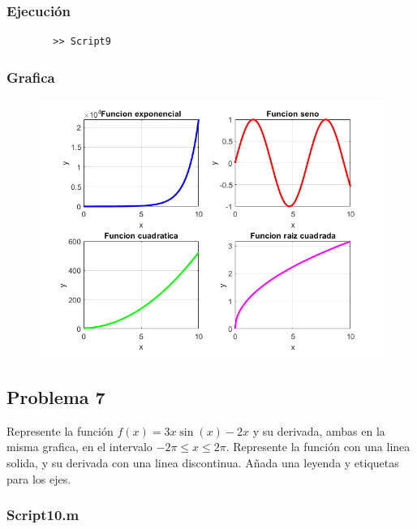 \documentclass{article}
\begin{document}
	\subsubsection{Ejecución}
	
	\begin{lstlisting}
		>> Script9
	\end{lstlisting}
	
	\newpage
	
	\subsubsection{Grafica}
	
	\begin{figure}[h]
		\centering
		\includegraphics[width=\textwidth]{grafica9.png}
	\end{figure}
	
	\newpage
	
	\subsection{Problema 7}
	
	Represente la función $f(x) = 3x \sin(x)-2x$ y su derivada, ambas en la misma grafica, en el intervalo $-2\pi \leq x \leq 2\pi$. Represente la función con una linea solida, y su derivada con una linea discontinua. Añada una leyenda y etiquetas para los ejes.
	
	\subsubsection{Script10.m}
	
\end{document}
